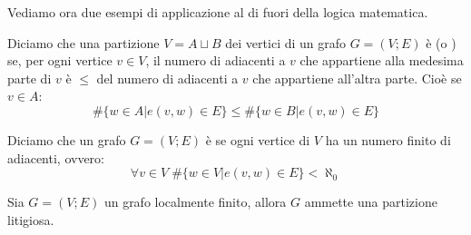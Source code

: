 Vediamo ora due esempi di applicazione al di fuori della logica matematica.

\begin{definition}
    Diciamo che una partizione $V = A \sqcup B$ dei vertici di un grafo $G = (V;E)$ è  (o ) se, per ogni vertice $v \in V$,
    il numero di adiacenti a $v$ che appartiene alla medesima parte di $v$ è $\leq$ del numero di adiacenti a $v$ che appartiene all'altra parte. Cioè se $v \in A$:
    \[ \#\{w \in A | e(v,w) \in E\} \leq \#\{w \in B | e(v,w) \in E\} \]
\end{definition}

\begin{definition}
    Diciamo che un grafo $G = (V;E)$ è  se ogni vertice di $V$ ha un numero finito di adiacenti, ovvero:
    \[ \forall v \in V \; \#\{w \in V | e(v,w) \in E\} < \aleph_0 \]
\end{definition}

\begin{proposition}
    Sia $G = (V;E)$ un grafo localmente finito, allora $G$ ammette una partizione litigiosa.
\end{proposition}

